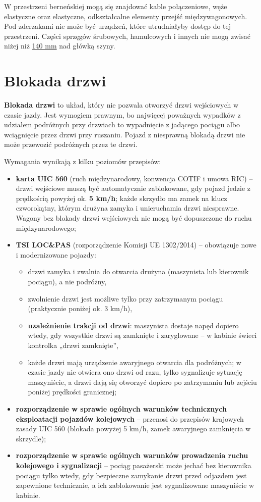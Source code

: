 W przestrzeni berneńskiej mogą się znajdować kable połączeniowe, węże elastyczne oraz elastyczne, odkształcalne elementy przejść międzywagonowych. Pod zderzakami nie może być urządzeń, które utrudniałyby dostęp do tej przestrzeni. Części sprzęgów śrubowych, hamulcowych i innych nie mogą zwisać niżej niż \underline{140 mm} nad główką szyny.

\section{Blokada drzwi}

\textbf{Blokada drzwi} to układ, który nie pozwala otworzyć drzwi wejściowych w czasie jazdy. Jest wymogiem prawnym, bo najwięcej poważnych wypadków z udziałem podróżnych przy drzwiach to wypadnięcie z jadącego pociągu albo wciągnięcie przez drzwi przy ruszaniu. Pojazd z niesprawną blokadą drzwi nie może przewozić podróżnych przez te drzwi.

Wymagania wynikają z kilku poziomów przepisów:
\begin{itemize}
	\item \textbf{karta UIC 560} (ruch międzynarodowy, konwencja COTIF i umowa RIC) – drzwi wejściowe muszą być automatycznie zablokowane, gdy pojazd jedzie z prędkością powyżej ok. \textbf{5 km/h}; każde skrzydło ma zamek na klucz czworokątny, którym drużyna zamyka i unieruchamia drzwi niesprawne. Wagony bez blokady drzwi wejściowych nie mogą być dopuszczone do ruchu międzynarodowego;
	\item \textbf{TSI LOC\&PAS} (rozporządzenie Komisji UE 1302/2014) – obowiązuje nowe i modernizowane pojazdy:
	\begin{itemize}
		\item drzwi zamyka i zwalnia do otwarcia drużyna (maszynista lub kierownik pociągu), a nie podróżny,
		\item zwolnienie drzwi jest możliwe tylko przy zatrzymanym pociągu (praktycznie poniżej ok. 3 km/h),
		\item \textbf{uzależnienie trakcji od drzwi}: maszynista dostaje napęd dopiero wtedy, gdy wszystkie drzwi są zamknięte i zaryglowane – w kabinie świeci kontrolka „drzwi zamknięte”,
		\item każde drzwi mają urządzenie awaryjnego otwarcia dla podróżnych; w czasie jazdy nie otwiera ono drzwi od razu, tylko sygnalizuje sytuację maszyniście, a drzwi dają się otworzyć dopiero po zatrzymaniu lub zejściu poniżej prędkości granicznej;
	\end{itemize}
	\item \textbf{rozporządzenie w sprawie ogólnych warunków technicznych eksploatacji pojazdów kolejowych} – przenosi do przepisów krajowych zasady UIC 560 (blokada powyżej 5 km/h, zamek awaryjnego zamknięcia w skrzydle);
	\item \textbf{rozporządzenie w sprawie ogólnych warunków prowadzenia ruchu kolejowego i sygnalizacji} – pociąg pasażerski może jechać bez kierownika pociągu tylko wtedy, gdy bezpieczne zamykanie drzwi przed odjazdem jest zapewnione technicznie, a ich zablokowanie jest sygnalizowane maszyniście w kabinie.
\end{itemize}

